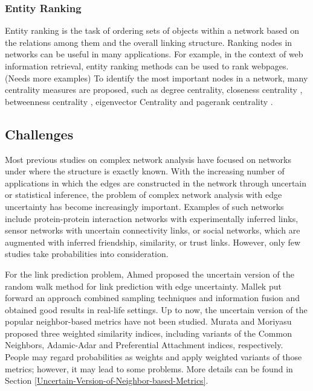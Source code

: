 \documentclass[\main/thesis.tex]{subfiles}
\begin{document}
\subsubsection{Entity Ranking}
Entity ranking is the task of ordering sets of objects within a network based on the relations among them and the overall linking structure. Ranking nodes in networks can be useful in many applications. For example, in the context of web information retrieval, entity ranking methods can be used to rank webpages. (Needs more examples) To identify the most important nodes in a network, many centrality measures are proposed, such as degree centrality, closeness centrality \cite{freeman1978centrality}, betweenness centrality \cite{freeman1977set}, eigenvector Centrality \cite{bonacich1987power} and pagerank centrality \cite{page1999pagerank}.

\subsection{Challenges}
Most previous studies on complex network analysis have focused on networks under where the structure is exactly known. With the increasing number of applications in which the edges  are  constructed  in  the  network  through  uncertain  or statistical  inference,  the  problem  of  complex network analysis with edge uncertainty has become increasingly important. Examples of such networks  include  protein-protein  interaction  networks  with experimentally inferred links, sensor networks with  uncertain  connectivity  links,  or  social  networks, which are augmented with inferred friendship, similarity, or trust links. However, only few studies take probabilities into consideration. 

For the link prediction problem, Ahmed \cite{ahmed2016efficient} proposed the uncertain version of the random walk method for link prediction with edge uncertainty. Mallek \cite{mallek2016evidential} put forward an approach combined sampling techniques and information fusion and obtained good results in real-life settings. Up to now, the uncertain version of the popular neighbor-based metrics have not been studied. Murata and Moriyasu \cite{murata2007link} proposed three weighted similarity indices, including variants of the Common Neighbors, Adamic-Adar and Preferential Attachment indices, respectively. People may regard probabilities as weights and apply weighted variants of those metrics; however, it may lead to some problems. More details can be found in Section \ref{Uncertain-Version-of-Neighbor-based-Metrics}.
\end{document}
